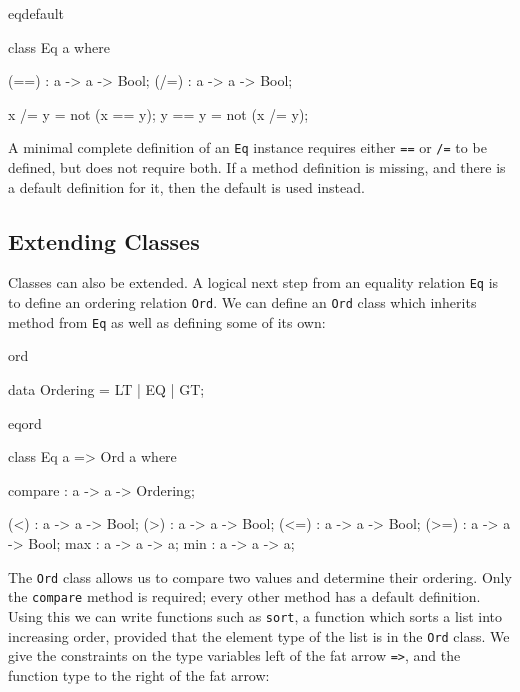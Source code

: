 \begin{SaveVerbatim}{eqdefault}

class Eq a where {
    (==) : a -> a -> Bool;
    (/=) : a -> a -> Bool;

    x /= y = not (x == y);
    y == y = not (x /= y);
}

\end{SaveVerbatim}

\noindent
A minimal complete definition of an \texttt{Eq} instance requires either \texttt{==}
or \texttt{/=} to be defined, but does not require both. If a method definition is
missing, and there is a default definition for it, then the default is used instead.

\subsection{Extending Classes}

Classes can also be extended. A logical next step from an equality relation \texttt{Eq}
is to define an ordering relation \texttt{Ord}. We can define an \texttt{Ord} class
which inherits method from \texttt{Eq} as well as defining some of its own:

\begin{SaveVerbatim}{ord}

data Ordering = LT | EQ | GT;

\end{SaveVerbatim}

\begin{SaveVerbatim}{eqord}

class Eq a => Ord a where {
    compare : a -> a -> Ordering;

    (<) : a -> a -> Bool;
    (>) : a -> a -> Bool;
    (<=) : a -> a -> Bool;
    (>=) : a -> a -> Bool;
    max : a -> a -> a;
    min : a -> a -> a;
}

\end{SaveVerbatim}

The \texttt{Ord} class allows us to compare two values and determine their ordering. 
Only the \texttt{compare} method is required; every other method has a default definition.
Using
this we can write functions such as \texttt{sort}, a function which sorts a list into
increasing order, provided that the element type of the list is in the \texttt{Ord} class.
We give the constraints on the type variables left of the fat arrow \texttt{=>}, and the
function type to the right of the fat arrow:

